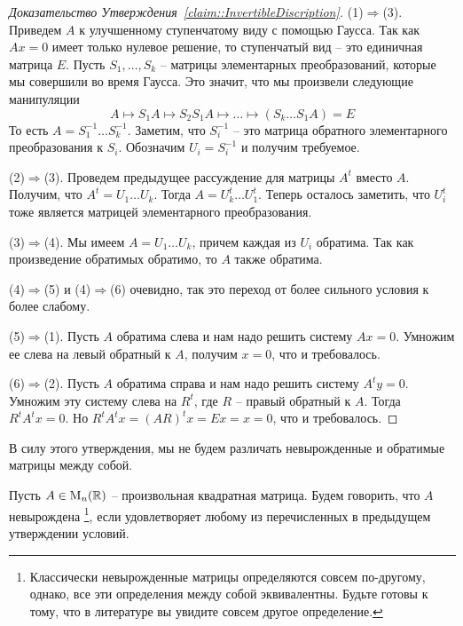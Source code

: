 \begin{proof}
[Доказательство Утверждения~\ref{claim::InvertibleDiscription}]
(1)$\Rightarrow$(3).
Приведем $A$ к улучшенному ступенчатому виду с помощью Гаусса.
Так как $Ax = 0$ имеет только нулевое решение, то ступенчатый вид -- это единичная матрица $E$.
Пусть $S_1, \ldots, S_k$ -- матрицы элементарных преобразований, которые мы совершили во время Гаусса.
Это значит, что мы произвели следующие манипуляции
\[
A \mapsto S_1 A \mapsto S_2 S_1 A \mapsto \ldots \mapsto (S_k \ldots S_1 A) = E
\]
То есть $A = S_1^{-1}\ldots S_k^{-1}$.
Заметим, что $S_i^{-1}$ -- это матрица обратного элементарного преобразования к $S_i$.
Обозначим $U_i = S_i^{-1}$ и получим требуемое.

(2)$\Rightarrow$(3).
Проведем предыдущее рассуждение для матрицы $A^t$ вместо $A$.
Получим, что $A^t = U_1\ldots U_k$.
Тогда $A = U_k^t \ldots U_1^t$.
Теперь осталось заметить, что $U_i^t$ тоже является матрицей элементарного преобразования.

(3)$\Rightarrow$(4).
Мы имеем $A=U_1\ldots U_k$, причем каждая из $U_i$ обратима.
Так как произведение обратимых обратимо, то $A$ также обратима.

(4)$\Rightarrow$(5) и (4)$\Rightarrow$(6) очевидно, так это переход от более сильного условия к более слабому.

(5)$\Rightarrow$(1).
Пусть $A$ обратима слева и нам надо решить систему $Ax = 0$.
Умножим ее слева на левый обратный к $A$, получим $x = 0$, что и требовалось.

(6)$\Rightarrow$(2).
Пусть $A$ обратима справа и нам надо решить систему $A^ty = 0$.
Умножим эту систему слева на $R^t$, где $R$ -- правый обратный к $A$.
Тогда $R^t A^t x = 0$.
Но $R^t A^t x = (AR)^tx = Ex = x = 0$, что и требовалось.
\end{proof}

В силу этого утверждения, мы не будем различать невырожденные и обратимые матрицы между собой.

\begin{definition}
Пусть $A\in\operatorname{M}_{n}(\mathbb R)$ -- произвольная квадратная матрица.
Будем говорить, что $A$ невырождена%
\footnote{Классически невырожденные матрицы определяются совсем по-другому, однако, все эти определения между собой эквивалентны.
Будьте готовы к тому, что в литературе вы увидите совсем другое определение.},
если удовлетворяет любому из перечисленных в предыдущем утверждении условий.
\end{definition}
